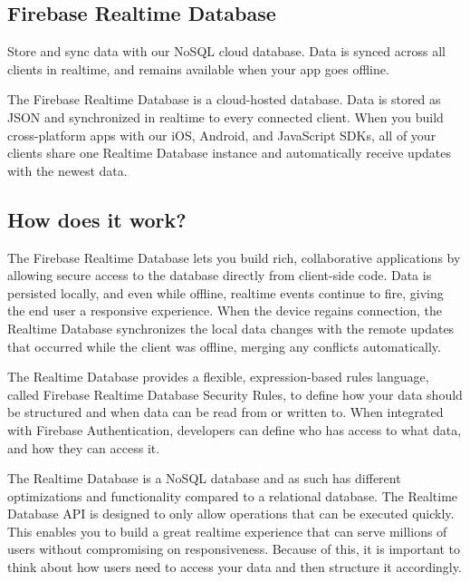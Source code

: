 \subsection{Firebase Realtime Database}
Store and sync data with our NoSQL cloud database. Data is synced across all clients in realtime, and remains available when your app goes offline.

The Firebase Realtime Database is a cloud-hosted database. Data is stored as JSON and synchronized in realtime to every connected client. When you build cross-platform apps with our iOS, Android, and JavaScript SDKs, all of your clients share one Realtime Database instance and automatically receive updates with the newest data.
\subsection{How does it work?}
The Firebase Realtime Database lets you build rich, collaborative applications by allowing secure access to the database directly from client-side code. Data is persisted locally, and even while offline, realtime events continue to fire, giving the end user a responsive experience. When the device regains connection, the Realtime Database synchronizes the local data changes with the remote updates that occurred while the client was offline, merging any conflicts automatically.

The Realtime Database provides a flexible, expression-based rules language, called Firebase Realtime Database Security Rules, to define how your data should be structured and when data can be read from or written to. When integrated with Firebase Authentication, developers can define who has access to what data, and how they can access it.

The Realtime Database is a NoSQL database and as such has different optimizations and functionality compared to a relational database. The Realtime Database API is designed to only allow operations that can be executed quickly. This enables you to build a great realtime experience that can serve millions of users without compromising on responsiveness. Because of this, it is important to think about how users need to access your data and then structure it accordingly.


\newpage
